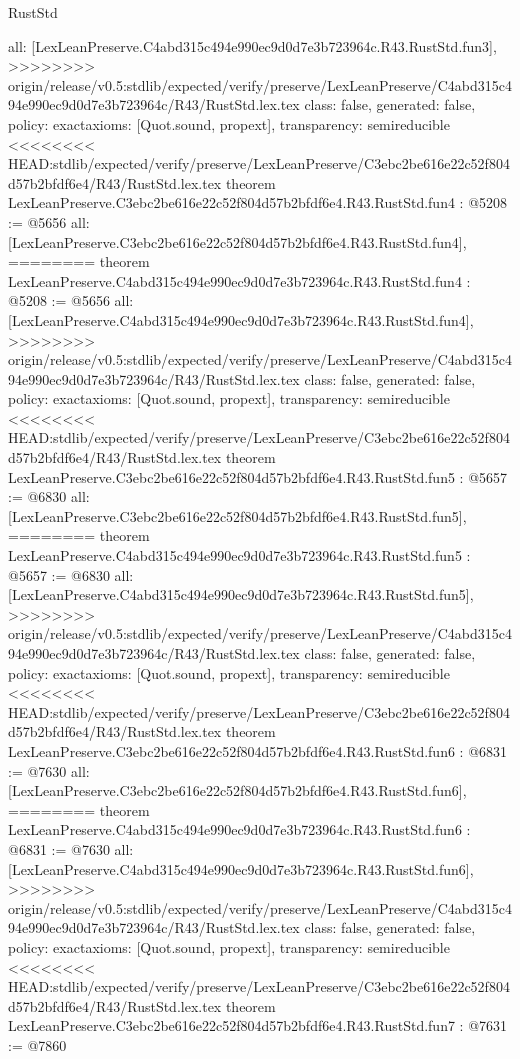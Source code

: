 \begin{lexlean}{RustStd}
\begin{coremodule}
{\begin{coremodule}
{{{{{{{  all: [LexLeanPreserve.C4abd315c494e990ec9d0d7e3b723964c.R43.RustStd.fun3],
>>>>>>>> origin/release/v0.5:stdlib/expected/verify/preserve/LexLeanPreserve/C4abd315c494e990ec9d0d7e3b723964c/R43/RustStd.lex.tex
  class: false,
  generated: false,
  policy: exact{axioms: [Quot.sound, propext]},
  transparency: semireducible
}
<<<<<<<< HEAD:stdlib/expected/verify/preserve/LexLeanPreserve/C3ebc2be616e22c52f804d57b2bfdf6e4/R43/RustStd.lex.tex
theorem LexLeanPreserve.C3ebc2be616e22c52f804d57b2bfdf6e4.R43.RustStd.fun4 : @5208 := @5656 {
  all: [LexLeanPreserve.C3ebc2be616e22c52f804d57b2bfdf6e4.R43.RustStd.fun4],
========
theorem LexLeanPreserve.C4abd315c494e990ec9d0d7e3b723964c.R43.RustStd.fun4 : @5208 := @5656 {
  all: [LexLeanPreserve.C4abd315c494e990ec9d0d7e3b723964c.R43.RustStd.fun4],
>>>>>>>> origin/release/v0.5:stdlib/expected/verify/preserve/LexLeanPreserve/C4abd315c494e990ec9d0d7e3b723964c/R43/RustStd.lex.tex
  class: false,
  generated: false,
  policy: exact{axioms: [Quot.sound, propext]},
  transparency: semireducible
}
<<<<<<<< HEAD:stdlib/expected/verify/preserve/LexLeanPreserve/C3ebc2be616e22c52f804d57b2bfdf6e4/R43/RustStd.lex.tex
theorem LexLeanPreserve.C3ebc2be616e22c52f804d57b2bfdf6e4.R43.RustStd.fun5 : @5657 := @6830 {
  all: [LexLeanPreserve.C3ebc2be616e22c52f804d57b2bfdf6e4.R43.RustStd.fun5],
========
theorem LexLeanPreserve.C4abd315c494e990ec9d0d7e3b723964c.R43.RustStd.fun5 : @5657 := @6830 {
  all: [LexLeanPreserve.C4abd315c494e990ec9d0d7e3b723964c.R43.RustStd.fun5],
>>>>>>>> origin/release/v0.5:stdlib/expected/verify/preserve/LexLeanPreserve/C4abd315c494e990ec9d0d7e3b723964c/R43/RustStd.lex.tex
  class: false,
  generated: false,
  policy: exact{axioms: [Quot.sound, propext]},
  transparency: semireducible
}
<<<<<<<< HEAD:stdlib/expected/verify/preserve/LexLeanPreserve/C3ebc2be616e22c52f804d57b2bfdf6e4/R43/RustStd.lex.tex
theorem LexLeanPreserve.C3ebc2be616e22c52f804d57b2bfdf6e4.R43.RustStd.fun6 : @6831 := @7630 {
  all: [LexLeanPreserve.C3ebc2be616e22c52f804d57b2bfdf6e4.R43.RustStd.fun6],
========
theorem LexLeanPreserve.C4abd315c494e990ec9d0d7e3b723964c.R43.RustStd.fun6 : @6831 := @7630 {
  all: [LexLeanPreserve.C4abd315c494e990ec9d0d7e3b723964c.R43.RustStd.fun6],
>>>>>>>> origin/release/v0.5:stdlib/expected/verify/preserve/LexLeanPreserve/C4abd315c494e990ec9d0d7e3b723964c/R43/RustStd.lex.tex
  class: false,
  generated: false,
  policy: exact{axioms: [Quot.sound, propext]},
  transparency: semireducible
}
<<<<<<<< HEAD:stdlib/expected/verify/preserve/LexLeanPreserve/C3ebc2be616e22c52f804d57b2bfdf6e4/R43/RustStd.lex.tex
theorem LexLeanPreserve.C3ebc2be616e22c52f804d57b2bfdf6e4.R43.RustStd.fun7 : @7631 := @7860 {
}}}}}}}}}}
\end{coremodule}}
\end{coremodule}
\end{lexlean}
